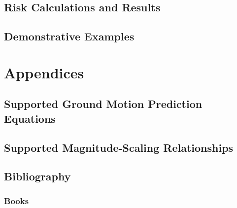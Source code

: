 \documentclass[11pt,fleqn]{book} %
\begin{document}
\chapter{Risk Calculations and Results}
	\label{chap:riskout}
	
   \cleardoublepage

\chapter{Demonstrative Examples}
	\label{chap:riskexamples}
	
   \cleardoublepage

\thispagestyle{empty}
\part*{Appendices}
\appendix

\chapter{Supported Ground Motion Prediction Equations}
	
   \cleardoublepage

\chapter{Supported Magnitude-Scaling Relationships}
	
   \cleardoublepage


\chapter*{Bibliography}
\section*{Books}
\printbibliography[heading=bibempty,type=book]
\end{document}
